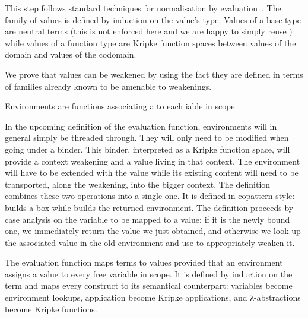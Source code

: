 This step follows standard techniques for normalisation
by evaluation~\cite{DBLP:conf/lics/BergerS91,DBLP:journals/mscs/CoquandD97,DBLP:journals/lisp/Coquand02}.
The family of values is defined by induction on the value's
type.
%
Values of a base type are neutral terms (this is not enforced here and
we are happy to simply reuse ) while values of a function type
are Kripke function spaces between values of the domain and values of
the codomain.


We prove that values can be weakened by using the fact they are
defined in terms of families already known to be amenable to weakenings.


Environments are functions associating a 
to each iable in scope.


In the upcoming definition of the evaluation function, environments
will in general simply be threaded through. They will only need to
be modified when going under a binder. This binder, interpreted as
a Kripke function space, will provide a context weakening and a value
living in that context.
%
The environment will have to be extended with the value while its
existing content will need to be transported, along the weakening,
into the bigger context.
%
The  definition combines these two operations into a single
one. It is defined in copattern style:
{} builds a box while {} builds the
returned environment. The definition proceeds by case analysis on the
variable to be mapped to a value: if it is the newly bound one, we
immediately return the value we just obtained, and otherwise we look
up the associated value in the old environment and use  to
appropriately weaken it.


The evaluation function maps terms to values provided that
an environment assigns a value to every free variable in scope.
It is defined by induction on the term and maps every construct
to its semantical counterpart: variables become environment lookups,
application become Kripke applications, and λ-abstractions become
Kripke functions.

\begin{AgdaSuppressSpace}
\end{AgdaSuppressSpace}

